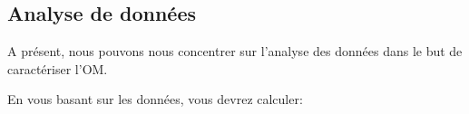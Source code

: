 \subsection{Analyse de donn\'ees}
A présent, nous pouvons nous concentrer sur l'analyse des données dans le but de caractériser l'OM.

En vous basant sur les données, vous devrez calculer:
\begin{center}
\end{center}

